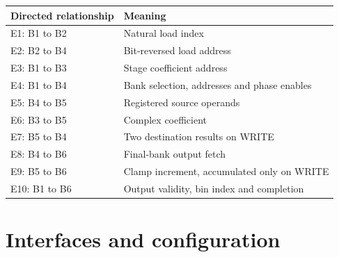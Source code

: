 \documentclass[11pt,a4paper]{article}
\begin{document}
{\small\renewcommand{\arraystretch}{1.18}\begin{longtable}{@{}L{0.24\textwidth}|L{0.7\textwidth}@{}}\toprule

\textbf{Directed relationship} & \textbf{Meaning}\\\midrule\endhead

E1: B1 to B2 & Natural load index\\[2pt]\hline

E2: B2 to B4 & Bit-reversed load address\\[2pt]\hline

E3: B1 to B3 & Stage coefficient address\\[2pt]\hline

E4: B1 to B4 & Bank selection,\allowbreak{} addresses and phase enables\\[2pt]\hline

E5: B4 to B5 & Registered source operands\\[2pt]\hline

E6: B3 to B5 & Complex coefficient\\[2pt]\hline

E7: B5 to B4 & Two destination results on WRITE\\[2pt]\hline

E8: B4 to B6 & Final-bank output fetch\\[2pt]\hline

E9: B5 to B6 & Clamp increment,\allowbreak{} accumulated only on WRITE\\[2pt]\hline

E10: B1 to B6 & Output validity,\allowbreak{} bin index and completion\\[2pt]\hline

\bottomrule\end{longtable}}

\section{Interfaces and configuration}
\end{document}
